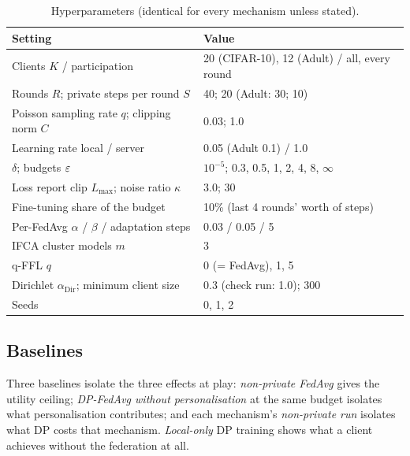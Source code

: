 \begin{table}[!t]
\caption{Hyperparameters (identical for every mechanism unless stated).}
\label{tab:hyper}
\centering
\footnotesize
\begin{tabular}{p{4.2cm}p{3.6cm}}
\toprule
Setting & Value \\
\midrule
Clients $K$ / participation & 20 (CIFAR-10), 12 (Adult) / all, every round \\
Rounds $R$; private steps per round $S$ & 40; 20 (Adult: 30; 10) \\
Poisson sampling rate $q$; clipping norm $C$ & 0.03; 1.0 \\
Learning rate local / server & 0.05 (Adult 0.1) / 1.0 \\
$\delta$; budgets $\varepsilon$ & $10^{-5}$; 0.3, 0.5, 1, 2, 4, 8, $\infty$ \\
Loss report clip $L_{\max}$; noise ratio $\kappa$ & 3.0; 30 \\
Fine-tuning share of the budget & 10\% (last 4 rounds' worth of steps) \\
Per-FedAvg $\alpha$ / $\beta$ / adaptation steps & 0.03 / 0.05 / 5 \\
IFCA cluster models $m$ & 3 \\
q-FFL $q$ & 0 (= FedAvg), 1, 5 \\
Dirichlet $\alpha_{\mathrm{Dir}}$; minimum client size & 0.3 (check run: 1.0); 300 \\
Seeds & 0, 1, 2 \\
\bottomrule
\end{tabular}
\end{table}

\subsection{Baselines}
Three baselines isolate the three effects at play: \emph{non-private FedAvg} gives the utility ceiling;
\emph{DP-FedAvg without personalisation} at the same budget isolates what personalisation contributes; and each
mechanism's \emph{non-private run} isolates what DP costs that mechanism. \emph{Local-only} DP training shows what a
client achieves without the federation at all.

